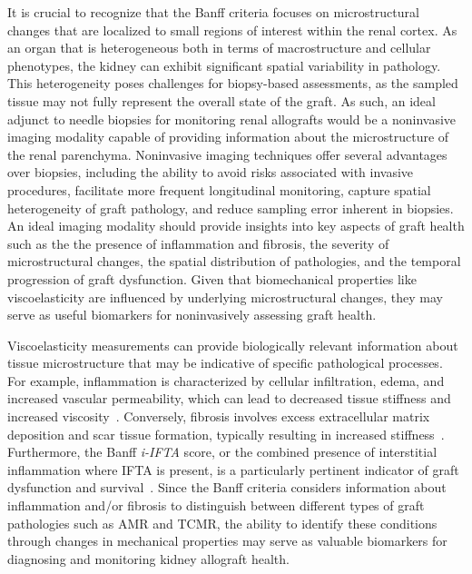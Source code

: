 It is crucial to recognize that the Banff criteria focuses on microstructural changes that are localized to small regions of interest within the renal cortex. As an organ that is heterogeneous both in terms of macrostructure and cellular phenotypes, the kidney can exhibit significant spatial variability in pathology. This heterogeneity poses challenges for biopsy-based assessments, as the sampled tissue may not fully represent the overall state of the graft. As such, an ideal adjunct to needle biopsies for monitoring renal allografts would be a noninvasive imaging modality capable of providing information about the microstructure of the renal parenchyma. Noninvasive imaging techniques offer several advantages over biopsies, including the ability to avoid risks associated with invasive procedures, facilitate more frequent longitudinal monitoring, capture spatial heterogeneity of graft pathology, and reduce sampling error inherent in biopsies. An ideal imaging modality should provide insights into key aspects of graft health such as the the presence of inflammation and fibrosis, the severity of microstructural changes, the spatial distribution of pathologies, and the temporal progression of graft dysfunction. Given that biomechanical properties like viscoelasticity are influenced by underlying microstructural changes, they may serve as useful biomarkers for noninvasively assessing graft health.


Viscoelasticity measurements can provide biologically relevant information about tissue microstructure that may be indicative of specific pathological processes. For example, inflammation is characterized by cellular infiltration, edema, and increased vascular permeability, which can lead to decreased tissue stiffness and increased viscosity~\cite{kimondo_Mechanical_2024}. Conversely, fibrosis involves excess extracellular matrix deposition and scar tissue formation, typically resulting in increased stiffness~\cite{wenger_Mechanical_2007}. Furthermore, the Banff \emph{i-IFTA} score, or the combined presence of interstitial inflammation where IFTA is present, is a particularly pertinent indicator of graft dysfunction and survival~\cite{gago_Kidney_2012,nankivell_causes_2018}. Since the Banff criteria considers information about inflammation and/or fibrosis to distinguish between different types of graft pathologies such as AMR and TCMR, the ability to identify these conditions through changes in mechanical properties may serve as valuable biomarkers for diagnosing and monitoring kidney allograft health.

